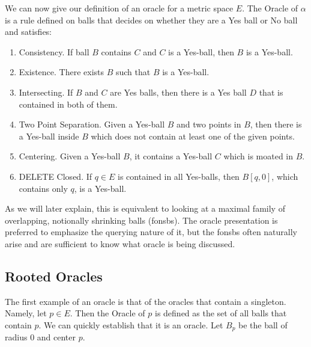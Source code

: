 \documentclass[12pt]{article}
\begin{document}
We can now give our definition of an oracle for a metric space $E$. The Oracle of $\alpha$ is a rule defined on balls that decides on whether they are a Yes ball or No ball and satisfies: 
\begin{enumerate}
    \item Consistency. If ball $B$ contains $C$ and $C$ is a Yes-ball, then $B$ is a Yes-ball.
    \item Existence. There exists $B$ such that $B$ is a Yes-ball.
    \item Intersecting. If $B$ and $C$ are Yes balls, then there is a Yes ball $D$ that is contained in both of them. 
    \item Two Point Separation. Given a Yes-ball $B$ and two points in $B$, then there is a Yes-ball inside $B$ which does not contain at least one of the given points. 
    \item Centering. Given a Yes-ball $B$, it contains a Yes-ball $C$ which is moated in $B$.
    \item DELETE Closed. If $q \in E$ is contained in all Yes-balls, then $B[q, 0]$, which contains only $q$, is a Yes-ball. 
\end{enumerate}

As we will later explain, this is equivalent to looking at a maximal family of overlapping, notionally shrinking balls (fonsbs). The oracle presentation is preferred to emphasize the querying nature of it, but the fonsbs often naturally arise and are sufficient to know what oracle is being discussed. 

\subsection{Rooted Oracles}

The first example of an oracle is that of the oracles that contain a singleton. Namely, let $p \in E$. Then the Oracle of $p$ is defined as the set of all balls that contain $p$. We can quickly establish that it is an oracle. Let $B_p$ be the ball of radius 0 and center $p$.
\end{document}
